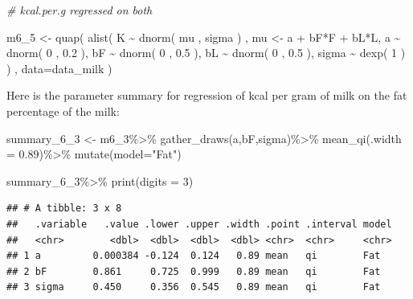 \documentclass[
]{book}
\newenvironment{Shaded}{\begin{snugshade}}{\end{snugshade}}
\newcommand{\AttributeTok}[1]{\textcolor[rgb]{0.77,0.63,0.00}{#1}}
\newcommand{\CommentTok}[1]{\textcolor[rgb]{0.56,0.35,0.01}{\textit{#1}}}
\newcommand{\DecValTok}[1]{\textcolor[rgb]{0.00,0.00,0.81}{#1}}
\newcommand{\FloatTok}[1]{\textcolor[rgb]{0.00,0.00,0.81}{#1}}
\newcommand{\FunctionTok}[1]{\textcolor[rgb]{0.00,0.00,0.00}{#1}}
\newcommand{\NormalTok}[1]{#1}
\newcommand{\OtherTok}[1]{\textcolor[rgb]{0.56,0.35,0.01}{#1}}
\newcommand{\SpecialCharTok}[1]{\textcolor[rgb]{0.00,0.00,0.00}{#1}}
\newcommand{\StringTok}[1]{\textcolor[rgb]{0.31,0.60,0.02}{#1}}
\begin{document}
\begin{Shaded}
\begin{Highlighting}[]
\CommentTok{\# kcal.per.g regressed on both }

\NormalTok{m6\_5 }\OtherTok{\textless{}{-}} \FunctionTok{quap}\NormalTok{( }
  \FunctionTok{alist}\NormalTok{(}
\NormalTok{    K }\SpecialCharTok{\textasciitilde{}} \FunctionTok{dnorm}\NormalTok{( mu , sigma )}
\NormalTok{    , mu }\OtherTok{\textless{}{-}}\NormalTok{ a }\SpecialCharTok{+}\NormalTok{ bF}\SpecialCharTok{*}\NormalTok{F }\SpecialCharTok{+}\NormalTok{ bL}\SpecialCharTok{*}\NormalTok{L, }
\NormalTok{    a }\SpecialCharTok{\textasciitilde{}} \FunctionTok{dnorm}\NormalTok{( }\DecValTok{0}\NormalTok{ , }\FloatTok{0.2}\NormalTok{ ),}
\NormalTok{    bF }\SpecialCharTok{\textasciitilde{}} \FunctionTok{dnorm}\NormalTok{( }\DecValTok{0}\NormalTok{ , }\FloatTok{0.5}\NormalTok{ ),}
\NormalTok{    bL }\SpecialCharTok{\textasciitilde{}} \FunctionTok{dnorm}\NormalTok{( }\DecValTok{0}\NormalTok{ , }\FloatTok{0.5}\NormalTok{ ), }
\NormalTok{    sigma }\SpecialCharTok{\textasciitilde{}} \FunctionTok{dexp}\NormalTok{( }\DecValTok{1}\NormalTok{ )}
\NormalTok{) , }\AttributeTok{data=}\NormalTok{data\_milk )}
\end{Highlighting}
\end{Shaded}

Here is the parameter summary for regression of kcal per gram of milk on the fat percentage of the milk:

\begin{Shaded}
\begin{Highlighting}[]
\NormalTok{summary\_6\_3 }\OtherTok{\textless{}{-}}\NormalTok{ m6\_3}\SpecialCharTok{\%\textgreater{}\%}
  \FunctionTok{gather\_draws}\NormalTok{(a,bF,sigma)}\SpecialCharTok{\%\textgreater{}\%}
  \FunctionTok{mean\_qi}\NormalTok{(}\AttributeTok{.width =} \FloatTok{0.89}\NormalTok{)}\SpecialCharTok{\%\textgreater{}\%}
  \FunctionTok{mutate}\NormalTok{(}\AttributeTok{model=}\StringTok{"Fat"}\NormalTok{)}

\NormalTok{summary\_6\_3}\SpecialCharTok{\%\textgreater{}\%}
  \FunctionTok{print}\NormalTok{(}\AttributeTok{digits =} \DecValTok{3}\NormalTok{)}
\end{Highlighting}
\end{Shaded}

\begin{verbatim}
## # A tibble: 3 x 8
##   .variable   .value .lower .upper .width .point .interval model
##   <chr>        <dbl>  <dbl>  <dbl>  <dbl> <chr>  <chr>     <chr>
## 1 a         0.000384 -0.124  0.124   0.89 mean   qi        Fat  
## 2 bF        0.861     0.725  0.999   0.89 mean   qi        Fat  
## 3 sigma     0.450     0.356  0.545   0.89 mean   qi        Fat
\end{verbatim}
\end{document}
